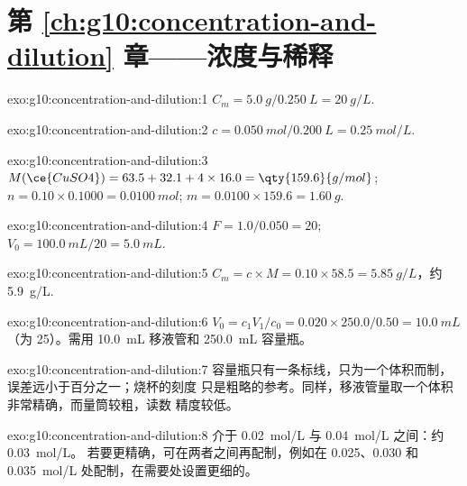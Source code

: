 \section*{第 \ref{ch:g10:concentration-and-dilution} 章——浓度与稀释}

\begin{solution}{exo:g10:concentration-and-dilution:1}
$C_m = \qty{5.0}{g} / \qty{0.250}{L} = \qty{20}{g/L}$.
\end{solution}

\begin{solution}{exo:g10:concentration-and-dilution:2}
$c = \qty{0.050}{mol} / \qty{0.200}{L} = \qty{0.25}{mol/L}$.
\end{solution}

\begin{solution}{exo:g10:concentration-and-dilution:3}
$M(\ce{CuSO4}) = 63.5 + 32.1 + 4 \times 16.0 = \qty{159.6}{g/mol}$;
$n = 0.10 \times 0.1000 = \qty{0.0100}{mol}$; $m = 0.0100 \times 159.6 =
\qty{1.60}{g}$.
\end{solution}

\begin{solution}{exo:g10:concentration-and-dilution:4}
$F = 1.0 / 0.050 = 20$; $V_0 = \qty{100.0}{mL} / 20 = \qty{5.0}{mL}$.
\end{solution}

\begin{solution}{exo:g10:concentration-and-dilution:5}
$C_m = c \times M = 0.10 \times 58.5 = \qty{5.85}{g/L}$，约
\qty{5.9}{g/L}.
\end{solution}

\begin{solution}{exo:g10:concentration-and-dilution:6}
$V_0 = c_1 V_1 / c_0 = 0.020 \times 250.0 / 0.50 = \qty{10.0}{mL}$
（为 25）。需用 \qty{10.0}{mL} 移液管和
\qty{250.0}{mL} 容量瓶。
\end{solution}

\begin{solution}{exo:g10:concentration-and-dilution:7}
容量瓶只有一条标线，只为一个体积而制，
误差远小于百分之一；烧杯的刻度
只是粗略的参考。同样，移液管量取一个体积
非常精确，而量筒较粗，读数
精度较低。
\end{solution}

\begin{solution}{exo:g10:concentration-and-dilution:8}
介于 \qty{0.02}{mol/L} 与 \qty{0.04}{mol/L} 之间：约 \qty{0.03}{mol/L}。
若要更精确，可在两者之间再配制，例如在
0.025、0.030 和 \qty{0.035}{mol/L} 处配制，在需要处设置更细的。
\end{solution}

